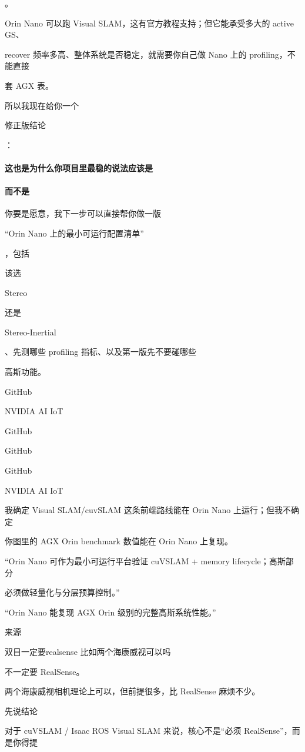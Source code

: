 \documentclass[12pt]{article}
\begin{document}
。

Orin Nano 可以跑 Visual SLAM，这有官方教程支持；但它能承受多大的 active GS、

recover 频率多高、整体系统是否稳定，就需要你自己做 Nano 上的 profiling，不能直接

套 AGX 表。

所以我现在给你一个

修正版结论

：

\paragraph{这也是为什么你项目里最稳的说法应该是}
\paragraph{而不是}
你要是愿意，我下一步可以直接帮你做一版

“Orin Nano 上的最小可运行配置清单”

，包括

该选

Stereo

还是

Stereo-Inertial

、先测哪些 profiling 指标、以及第一版先不要碰哪些

高斯功能。

GitHub

NVIDIA AI IoT

GitHub

GitHub

GitHub

NVIDIA AI IoT

我确定 Visual SLAM/cuvSLAM 这条前端路线能在 Orin Nano 上运行；但我不确定

你图里的 AGX Orin benchmark 数值能在 Orin Nano 上复现。

“Orin Nano 可作为最小可运行平台验证 cuVSLAM + memory lifecycle；高斯部分

必须做轻量化与分层预算控制。”

“Orin Nano 能复现 AGX Orin 级别的完整高斯系统性能。”

来源

双目一定要realsense 比如两个海康威视可以吗

不一定要 RealSense。

两个海康威视相机理论上可以，但前提很多，比 RealSense 麻烦不少。

先说结论

对于 cuVSLAM / Isaac ROS Visual SLAM 来说，核心不是“必须 RealSense”，而是你得提
\end{document}
